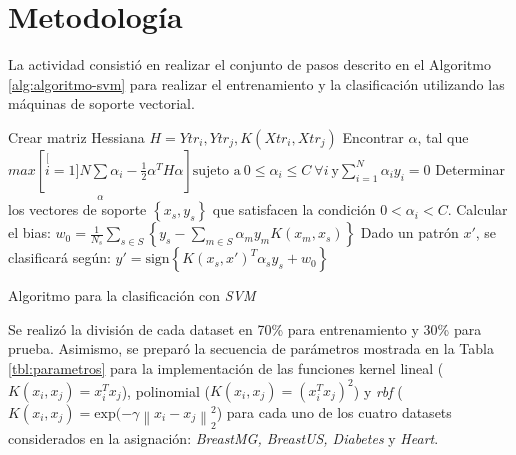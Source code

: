 \documentclass[spanish,12pt]{article}
\begin{document}
\section{Metodología}

La actividad consistió en realizar el conjunto de pasos descrito en el Algoritmo \ref{alg:algoritmo-svm} para realizar el entrenamiento y la clasificación utilizando las máquinas de soporte vectorial.
\begin{algorithm} 
\begin{algorithmic}[1] 
\STATE Crear matriz Hessiana $H = Ytr_i,Ytr_j,K(Xtr_i,Xtr_j)$
\STATE Encontrar $\alpha$, tal que 
$\underset{\alpha}{max\left[\stackrel[i=1]{N}{\sum}\alpha_{i}-\frac{1}{2}\alpha^{T}H\alpha\right]} \text{sujeto a}~ 0\leq \alpha_{i}\leq{C} ~\forall i ~\text{y}\sum_{i=1}^{N}\alpha_{i}y_{i}=0$
\STATE Determinar los vectores de soporte $\left\{x_{s},y_{s} \right\}$ que satisfacen la condición $ 0 < \alpha_{i} <  {C} $.
\STATE Calcular el bias:
$w_{0}=\frac{1}{N_s}\sum_{s\in S}\left\{ y_s - \sum_{m\in S}\alpha_m y_m K(x_m , x_s) \right\}$
\STATE Dado un patrón $x'$, se clasificará según:
$y' = \text{sign}\left\{ K(x_s , x')^{T} \alpha_s y_s + w_0 \right\}$
\end{algorithmic} 
\caption{Algoritmo para la clasificación con \emph{SVM}} 
\label{alg:algoritmo-svm}
\end{algorithm}


Se realizó la división de cada dataset en 70\% para entrenamiento y 30\% para prueba.
Asimismo, se preparó la secuencia de parámetros mostrada en la Tabla \ref{tbl:parametros} para la implementación de las funciones kernel lineal ($K(x_i, x_j) = x^T_i x_j$), polinomial ($K(x_i, x_j) = (x^T_i x_j)^2$) y \emph{rbf} ($K(x_i, x_j)=\text{exp}(-\gamma \left\lVert x_i - x_j \right\rVert_2^2$) para cada uno de los cuatro datasets considerados en la asignación: \emph{BreastMG, BreastUS, Diabetes} y \emph{Heart}.
\end{document}
